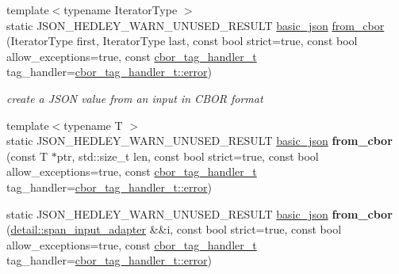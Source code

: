 \begin{DoxyCompactItemize}
{\footnotesize template$<$typename Iterator\+Type $>$ }\\static J\+S\+O\+N\+\_\+\+H\+E\+D\+L\+E\+Y\+\_\+\+W\+A\+R\+N\+\_\+\+U\+N\+U\+S\+E\+D\+\_\+\+R\+E\+S\+U\+LT \hyperlink{classnlohmann_1_1basic__json}{basic\+\_\+json} \hyperlink{classnlohmann_1_1basic__json_aba4f6fc79cc405fb212ea3d992334e71}{from\+\_\+cbor} (Iterator\+Type first, Iterator\+Type last, const bool strict=true, const bool allow\+\_\+exceptions=true, const \hyperlink{namespacenlohmann_1_1detail_a58bb1ef1a9ad287a9cfaf1855784d9ac}{cbor\+\_\+tag\+\_\+handler\+\_\+t} tag\+\_\+handler=\hyperlink{namespacenlohmann_1_1detail_a58bb1ef1a9ad287a9cfaf1855784d9acacb5e100e5a9a3e7f6d1fd97512215282}{cbor\+\_\+tag\+\_\+handler\+\_\+t\+::error})
\begin{DoxyCompactList}\small\item\em create a J\+S\+ON value from an input in C\+B\+OR format \end{DoxyCompactList}\item 
\mbox{\label{classnlohmann_1_1basic__json_a188755c8cda27e2afb03c016c14125d8}} 
{\footnotesize template$<$typename T $>$ }\\static J\+S\+O\+N\+\_\+\+H\+E\+D\+L\+E\+Y\+\_\+\+W\+A\+R\+N\+\_\+\+U\+N\+U\+S\+E\+D\+\_\+\+R\+E\+S\+U\+LT \hyperlink{classnlohmann_1_1basic__json}{basic\+\_\+json} {\bfseries from\+\_\+cbor} (const T $\ast$ptr, std\+::size\+\_\+t len, const bool strict=true, const bool allow\+\_\+exceptions=true, const \hyperlink{namespacenlohmann_1_1detail_a58bb1ef1a9ad287a9cfaf1855784d9ac}{cbor\+\_\+tag\+\_\+handler\+\_\+t} tag\+\_\+handler=\hyperlink{namespacenlohmann_1_1detail_a58bb1ef1a9ad287a9cfaf1855784d9acacb5e100e5a9a3e7f6d1fd97512215282}{cbor\+\_\+tag\+\_\+handler\+\_\+t\+::error})
\item 
\mbox{\label{classnlohmann_1_1basic__json_a4a67e47f4bcde55214475f47f8314c1f}} 
static J\+S\+O\+N\+\_\+\+H\+E\+D\+L\+E\+Y\+\_\+\+W\+A\+R\+N\+\_\+\+U\+N\+U\+S\+E\+D\+\_\+\+R\+E\+S\+U\+LT \hyperlink{classnlohmann_1_1basic__json}{basic\+\_\+json} {\bfseries from\+\_\+cbor} (\hyperlink{classnlohmann_1_1detail_1_1span__input__adapter}{detail\+::span\+\_\+input\+\_\+adapter} \&\&i, const bool strict=true, const bool allow\+\_\+exceptions=true, const \hyperlink{namespacenlohmann_1_1detail_a58bb1ef1a9ad287a9cfaf1855784d9ac}{cbor\+\_\+tag\+\_\+handler\+\_\+t} tag\+\_\+handler=\hyperlink{namespacenlohmann_1_1detail_a58bb1ef1a9ad287a9cfaf1855784d9acacb5e100e5a9a3e7f6d1fd97512215282}{cbor\+\_\+tag\+\_\+handler\+\_\+t\+::error})

\end{DoxyCompactItemize}
